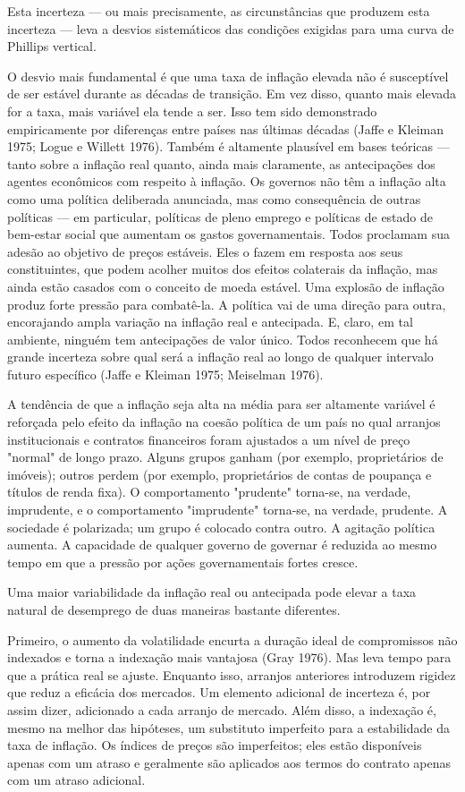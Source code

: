 \documentclass[12pt]{article}
\begin{document}
Esta incerteza — ou mais precisamente, as circunstâncias que produzem esta incerteza — leva a desvios sistemáticos das condições exigidas para uma curva de Phillips vertical.

O desvio mais fundamental é que uma taxa de inflação elevada não é susceptível de ser estável durante as décadas de transição. Em vez disso, quanto mais elevada for a taxa, mais variável ela tende a ser. Isso tem sido demonstrado empiricamente por diferenças entre países nas últimas décadas (Jaffe e Kleiman 1975; Logue e Willett 1976). Também é altamente plausível em bases teóricas — tanto sobre a inflação real quanto, ainda mais claramente, as antecipações dos agentes econômicos com respeito à inflação. Os governos não têm a inflação alta como uma política deliberada anunciada, mas como consequência de outras políticas — em particular, políticas de pleno emprego e políticas de estado de bem-estar social que aumentam os gastos governamentais. Todos proclamam sua adesão ao objetivo de preços estáveis. Eles o fazem em resposta aos seus constituintes, que podem acolher muitos dos efeitos colaterais da inflação, mas ainda estão casados com o conceito de moeda estável. Uma explosão de inflação produz forte pressão para combatê-la. A política vai de uma direção para outra, encorajando ampla variação na inflação real e antecipada. E, claro, em tal ambiente, ninguém tem antecipações de valor único. Todos reconhecem que há grande incerteza sobre qual será a inflação real ao longo de qualquer intervalo futuro específico (Jaffe e Kleiman 1975; Meiselman 1976).

A tendência de que a inflação seja alta na média para ser altamente variável é reforçada pelo efeito da inflação na coesão política de um país no qual arranjos institucionais e contratos financeiros foram ajustados a um nível de preço "normal" de longo prazo. Alguns grupos ganham (por exemplo, proprietários de imóveis); outros perdem (por exemplo, proprietários de contas de poupança e títulos de renda fixa). O comportamento "prudente" torna-se, na verdade, imprudente, e o comportamento "imprudente" torna-se, na verdade, prudente. A sociedade é polarizada; um grupo é colocado contra outro. A agitação política aumenta. A capacidade de qualquer governo de governar é reduzida ao mesmo tempo em que a pressão por ações governamentais fortes cresce.

Uma maior variabilidade da inflação real ou antecipada pode elevar a taxa natural de desemprego de duas maneiras bastante diferentes.

Primeiro, o aumento da volatilidade encurta a duração ideal de compromissos não indexados e torna a indexação mais vantajosa (Gray 1976). Mas leva tempo para que a prática real se ajuste. Enquanto isso, arranjos anteriores introduzem rigidez que reduz a eficácia dos mercados. Um elemento adicional de incerteza é, por assim dizer, adicionado a cada arranjo de mercado. Além disso, a indexação é, mesmo na melhor das hipóteses, um substituto imperfeito para a estabilidade da taxa de inflação. Os índices de preços são imperfeitos; eles estão disponíveis apenas com um atraso e geralmente são aplicados aos termos do contrato apenas com um atraso adicional.
\end{document}
